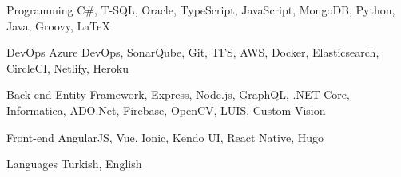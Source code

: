 
\begin{cvskills}

  \cvskill
    {Programming} %
    {C\#, T-SQL, Oracle, TypeScript, JavaScript, MongoDB, Python, Java, Groovy, \LaTeX} %

  \cvskill
    {DevOps} %
    {Azure DevOps, SonarQube, Git, TFS, AWS, Docker, Elasticsearch, CircleCI, Netlify, Heroku} %

  \cvskill
    {Back-end} %
    {Entity Framework, Express, Node.js, GraphQL, .NET Core, Informatica, ADO.Net, Firebase, OpenCV, LUIS, Custom Vision} %

  \cvskill
    {Front-end} %
    {AngularJS, Vue, Ionic, Kendo UI, React Native, Hugo} %

  \cvskill
    {Languages} %
    {Turkish, English} %

\end{cvskills}
